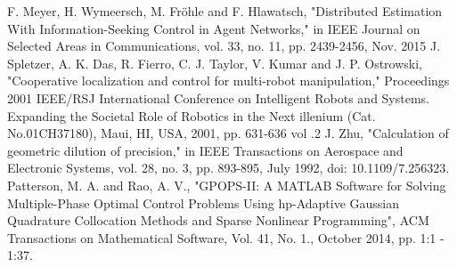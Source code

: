 \documentclass[conference]{IEEEtran}
\begin{document}
\begin{thebibliography}{00}
 F. Meyer, H. Wymeersch, M. Fr\"{o}hle and F. Hlawatsch, "Distributed Estimation With Information-Seeking Control in Agent Networks," in IEEE Journal on Selected Areas in Communications, vol. 33, no. 11, pp. 2439-2456, Nov. 2015
 J. Spletzer, A. K. Das, R. Fierro, C. J. Taylor, V. Kumar and J. P. Ostrowski, "Cooperative localization and control for multi-robot manipulation," Proceedings 2001 IEEE/RSJ International Conference on Intelligent Robots and Systems. Expanding the Societal Role of Robotics in the Next illenium (Cat. No.01CH37180), Maui, HI, USA, 2001, pp. 631-636 vol .2
J. Zhu, "Calculation of geometric dilution of precision," in IEEE Transactions on Aerospace and Electronic Systems, vol. 28, no. 3, pp. 893-895, July 1992, doi: 10.1109/7.256323.
Patterson, M. A. and Rao, A. V., "GPOPS-II: A MATLAB Software for Solving Multiple-Phase Optimal Control Problems Using hp-Adaptive Gaussian Quadrature Collocation Methods and Sparse Nonlinear Programming", ACM Transactions on Mathematical Software, Vol. 41, No. 1., October 2014, pp. 1:1 - 1:37.

\end{thebibliography}
\end{document}
